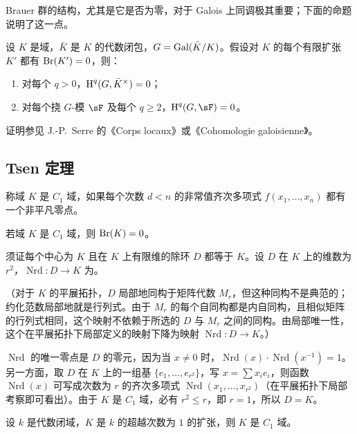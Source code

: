 Brauer 群的结构，尤其是它是否为零，对于 Galois 上同调极其重要；下面的命题说明了这一点。

\begin{proposition}\label{I:3-1-6}
设 $K$ 是域，$\bar K$ 是 $K$ 的代数闭包，$G=\operatorname{Gal}(\bar K/K)$。假设对 $K$ 的每个有限扩张 $K'$ 都有 $\operatorname{Br}(K')=0$，则：
\begin{enumerate}[\indent i)]
\item 对每个 $q>0$，$\operatorname{H}^q(G,\bar K^\times)=0$；
\item 对每个挠 $G$-模 $\sF$ 及每个 $q\geq2$，$\h^q(G,\sF)=0$。
\end{enumerate}
\end{proposition}
证明参见 J.-P.\ Serre 的《Corps locaux》或《Cohomologie galoisienne》\cite{se94}。

\subsection{Tsen 定理}\label{I:3-2}
\begin{definition}\label{I:3-2-1}
称域 $K$ 是 $C_1$ 域，如果每个次数 $d<n$ 的非常值齐次多项式 $f(x_1,\dotsc,x_n)$ 都有一个非平凡零点。
\end{definition}

\begin{proposition}\label{I:3-2-2}
若域 $K$ 是 $C_1$ 域，则 $\operatorname{Br}(K)=0$。
\end{proposition}

须证每个中心为 $K$ 且在 $K$ 上有限维的除环 $D$ 都等于 $K$。设 $D$ 在 $K$ 上的维数为 $r^2$，$\operatorname{Nrd}:D\to K$ 为。

（对于 $K$ 的平展拓扑，$D$ 局部地同构于矩阵代数 $M_r$，但这种同构不是典范的；约化范数局部地就是行列式。由于 $M_r$ 的每个自同构都是内自同构，且相似矩阵的行列式相同，这个映射不依赖于所选的 $D$ 与 $M_r$ 之间的同构。由局部唯一性，这个在平展拓扑下局部定义的映射下降为映射 $\operatorname{Nrd}:D\to K$。）

$\operatorname{Nrd}$ 的唯一零点是 $D$ 的零元，因为当 $x\ne0$ 时，$\operatorname{Nrd}(x)\cdot\operatorname{Nrd}(x^{-1})=1$。另一方面，取 $D$ 在 $K$ 上的一组基 $\{e_1,\dotsc,e_{r^2}\}$，写 $x=\sum x_ie_i$，则函数 $\operatorname{Nrd}(x)$ 可写成次数为 $r$ 的齐次多项式 $\operatorname{Nrd}(x_1,\dotsc,x_{r^2})$（在平展拓扑下局部考察即可看出）。由于 $K$ 是 $C_1$ 域，必有 $r^2\leq r$，即 $r=1$，所以 $D=K$。

\begin{theorem}[Tsen]\label{I:3-2-3}
设 $k$ 是代数闭域，$K$ 是 $k$ 的超越次数为 $1$ 的扩张，则 $K$ 是 $C_1$ 域。
\end{theorem}

